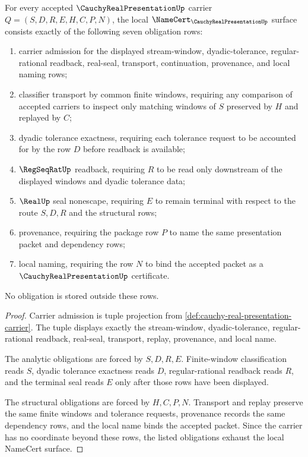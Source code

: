 \begin{theorem}
\label{thm:cauchy-real-presentation-namecert-obligations}
For every accepted $\CauchyRealPresentationUp$ carrier $Q=(S,D,R,E,H,C,P,N)$, the local $\NameCert_{\CauchyRealPresentationUp}$ surface consists exactly of the following seven obligation rows:
\begin{enumerate}
\item carrier admission for the displayed stream-window, dyadic-tolerance, regular-rational readback, real-seal, transport, continuation, provenance, and local naming rows;
\item classifier transport by common finite windows, requiring any comparison of accepted carriers to inspect only matching windows of $S$ preserved by $H$ and replayed by $C$;
\item dyadic tolerance exactness, requiring each tolerance request to be accounted for by the row $D$ before readback is available;
\item $\RegSeqRatUp$ readback, requiring $R$ to be read only downstream of the displayed windows and dyadic tolerance data;
\item $\RealUp$ seal nonescape, requiring $E$ to remain terminal with respect to the route $S,D,R$ and the structural rows;
\item provenance, requiring the package row $P$ to name the same presentation packet and dependency rows;
\item local naming, requiring the row $N$ to bind the accepted packet as a $\CauchyRealPresentationUp$ certificate.
\end{enumerate}
No obligation is stored outside these rows.
\end{theorem}
\begin{proof}
Carrier admission is tuple projection from \autoref{def:cauchy-real-presentation-carrier}. The tuple displays exactly the stream-window, dyadic-tolerance, regular-rational readback, real-seal, transport, replay, provenance, and local name.

The analytic obligations are forced by $S,D,R,E$. Finite-window classification reads $S$, dyadic tolerance exactness reads $D$, regular-rational readback reads $R$, and the terminal seal reads $E$ only after those rows have been displayed.

The structural obligations are forced by $H,C,P,N$. Transport and replay preserve the same finite windows and tolerance requests, provenance records the same dependency rows, and the local name binds the accepted packet. Since the carrier has no coordinate beyond these rows, the listed obligations exhaust the local NameCert surface.
\end{proof}

